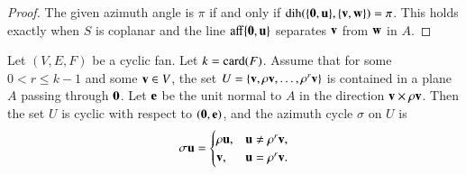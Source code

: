 \begin{proof}  The given azimuth angle is $\pi$ if and only if $\operatorname{dih}(\{{\mathbf 0},{\mathbf u}\},\{{\mathbf v},{\mathbf w}\})=\pi$.  This holds
exactly when $S$ is coplanar and the line ${\operatorname{aff}}\{{\mathbf 0},{\mathbf u}\}$ separates ${\mathbf v}$ from ${\mathbf w}$ in $A$.
\end{proof}

\begin{lemma}
Let $(V,E,F)$ be a cyclic fan.  Let $k={\operatorname{card}}(F)$.  Assume that for some $0<r\le k-1$ and some ${\mathbf v}\in V$, the set $U=\{{\mathbf v},\rho {\mathbf v},\ldots,\rho^r {\mathbf v}\}$ is contained in a plane $A$ passing through ${\mathbf 0}$.  Let ${\mathbf e}$ be the unit normal to $A$ in the direction ${\mathbf v}\times \rho {\mathbf v}$.  Then 
the set $U$ is cyclic with respect to $({\mathbf 0},{\mathbf e})$, and the azimuth cycle $\sigma$ on $U$ is 
$$
\sigma {\mathbf u} = \begin{cases} \rho {\mathbf u}, & {\mathbf u}\ne \rho^r{\mathbf v},\\ {\mathbf v}, & {\mathbf u} = \rho^r{\mathbf v}.\end{cases}
$$
\end{lemma}


